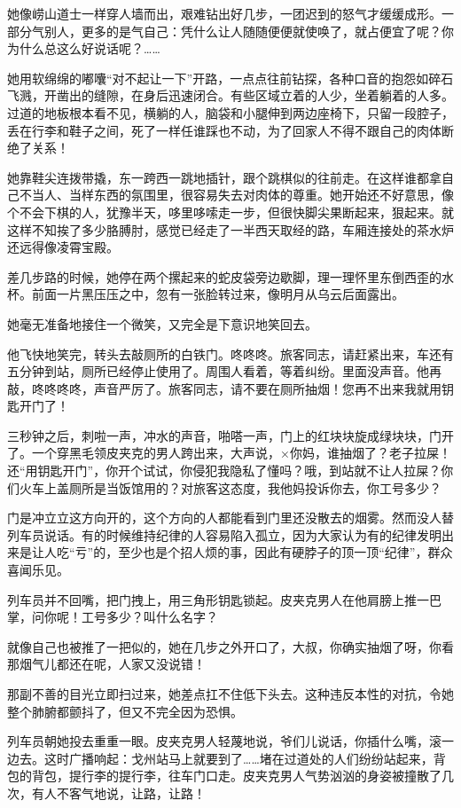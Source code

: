 \documentclass[lang=cn,newtx,12pt,scheme=chinese]{elegantbook}
\begin{document}
她像崂山道士一样穿人墙而出，艰难钻出好几步，一团迟到的怒气才缓缓成形。一部分气别人，更多的是气自己：凭什么让人随随便便就使唤了，就占便宜了呢？你为什么总这么好说话呢？……

她用软绵绵的嘟囔“对不起让一下”开路，一点点往前钻探，各种口音的抱怨如碎石飞溅，开凿出的缝隙，在身后迅速闭合。有些区域立着的人少，坐着躺着的人多。过道的地板根本看不见，横躺的人，脑袋和小腿伸到两边座椅下，只留一段腔子，丢在行李和鞋子之间，死了一样任谁踩也不动，为了回家人不得不跟自己的肉体断绝了关系！

她靠鞋尖连拨带撬，东一跨西一跳地插针，跟个跳棋似的往前走。在这样谁都拿自己不当人、当样东西的氛围里，很容易失去对肉体的尊重。她开始还不好意思，像个不会下棋的人，犹豫半天，哆里哆嗦走一步，但很快脚尖果断起来，狠起来。就这样不知挨了多少胳膊肘，感觉已经走了一半西天取经的路，车厢连接处的茶水炉还远得像凌霄宝殿。

差几步路的时候，她停在两个摞起来的蛇皮袋旁边歇脚，理一理怀里东倒西歪的水杯。前面一片黑压压之中，忽有一张脸转过来，像明月从乌云后面露出。

她毫无准备地接住一个微笑，又完全是下意识地笑回去。

他飞快地笑完，转头去敲厕所的白铁门。咚咚咚。旅客同志，请赶紧出来，车还有五分钟到站，厕所已经停止使用了。周围人看着，等着纠纷。里面没声音。他再敲，咚咚咚咚，声音严厉了。旅客同志，请不要在厕所抽烟！您再不出来我就用钥匙开门了！

三秒钟之后，刺啦一声，冲水的声音，啪嗒一声，门上的红块块旋成绿块块，门开了。一个穿黑毛领皮夹克的男人跨出来，大声说，×你妈，谁抽烟了？老子拉屎！还“用钥匙开门”，你开个试试，你侵犯我隐私了懂吗？哦，到站就不让人拉屎？你们火车上盖厕所是当饭馆用的？对旅客这态度，我他妈投诉你去，你工号多少？

门是冲立立这方向开的，这个方向的人都能看到门里还没散去的烟雾。然而没人替列车员说话。有的时候维持纪律的人容易陷入孤立，因为大家认为有的纪律发明出来是让人吃“亏”的，至少也是个招人烦的事，因此有硬脖子的顶一顶“纪律”，群众喜闻乐见。

列车员并不回嘴，把门拽上，用三角形钥匙锁起。皮夹克男人在他肩膀上推一巴掌，问你呢！工号多少？叫什么名字？

就像自己也被推了一把似的，她在几步之外开口了，大叔，你确实抽烟了呀，你看那烟气儿都还在呢，人家又没说错！

那副不善的目光立即扫过来，她差点扛不住低下头去。这种违反本性的对抗，令她整个肺腑都颤抖了，但又不完全因为恐惧。

列车员朝她投去重重一眼。皮夹克男人轻蔑地说，爷们儿说话，你插什么嘴，滚一边去。这时广播响起：戈州站马上就要到了……堵在过道处的人们纷纷站起来，背包的背包，提行李的提行李，往车门口走。皮夹克男人气势汹汹的身姿被撞散了几次，有人不客气地说，让路，让路！
\end{document}
